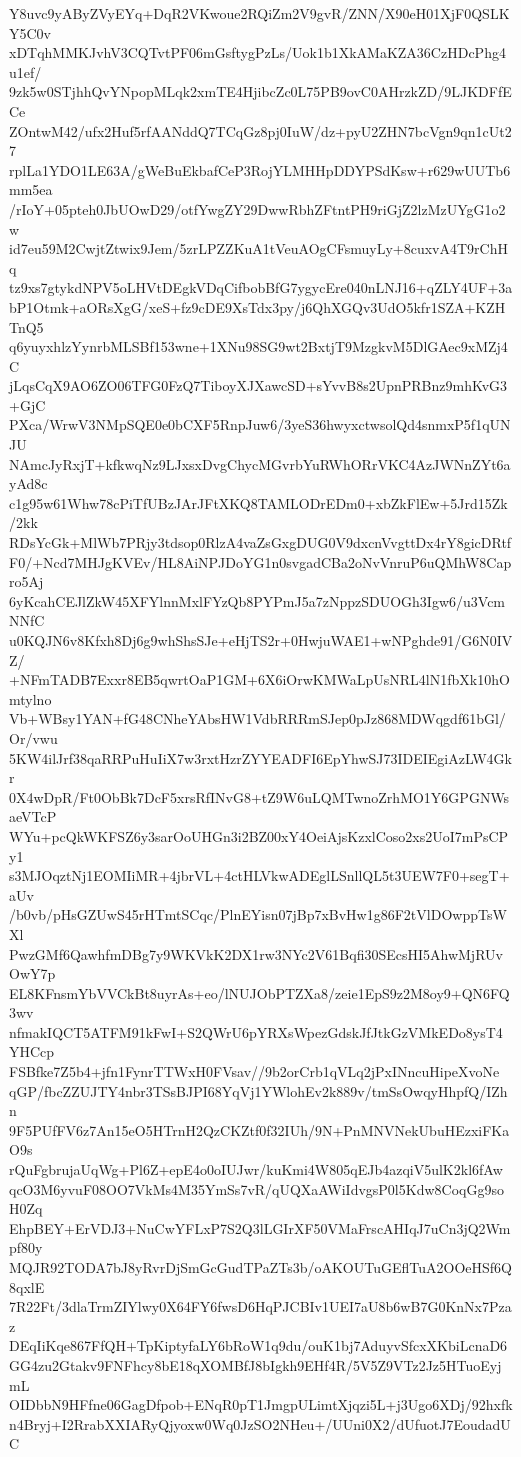 Y8uvc9yAByZVyEYq+DqR2VKwoue2RQiZm2V9gvR/ZNN/X90eH01XjF0QSLKY5C0v
xDTqhMMKJvhV3CQTvtPF06mGsftygPzLs/Uok1b1XkAMaKZA36CzHDcPhg4u1ef/
9zk5w0STjhhQvYNpopMLqk2xmTE4HjibcZc0L75PB9ovC0AHrzkZD/9LJKDFfECe
ZOntwM42/ufx2Huf5rfAANddQ7TCqGz8pj0IuW/dz+pyU2ZHN7bcVgn9qn1cUt27
rplLa1YDO1LE63A/gWeBuEkbafCeP3RojYLMHHpDDYPSdKsw+r629wUUTb6mm5ea
/rIoY+05pteh0JbUOwD29/otfYwgZY29DwwRbhZFtntPH9riGjZ2lzMzUYgG1o2w
id7eu59M2CwjtZtwix9Jem/5zrLPZZKuA1tVeuAOgCFsmuyLy+8cuxvA4T9rChHq
tz9xs7gtykdNPV5oLHVtDEgkVDqCifbobBfG7ygycEre040nLNJ16+qZLY4UF+3a
bP1Otmk+aORsXgG/xeS+fz9cDE9XsTdx3py/j6QhXGQv3UdO5kfr1SZA+KZHTnQ5
q6yuyxhlzYynrbMLSBf153wne+1XNu98SG9wt2BxtjT9MzgkvM5DlGAec9xMZj4C
jLqsCqX9AO6ZO06TFG0FzQ7TiboyXJXawcSD+sYvvB8s2UpnPRBnz9mhKvG3+GjC
PXca/WrwV3NMpSQE0e0bCXF5RnpJuw6/3yeS36hwyxctwsolQd4snmxP5f1qUNJU
NAmcJyRxjT+kfkwqNz9LJxsxDvgChycMGvrbYuRWhORrVKC4AzJWNnZYt6ayAd8c
c1g95w61Whw78cPiTfUBzJArJFtXKQ8TAMLODrEDm0+xbZkFlEw+5Jrd15Zk/2kk
RDsYcGk+MlWb7PRjy3tdsop0RlzA4vaZsGxgDUG0V9dxcnVvgttDx4rY8gicDRtf
F0/+Ncd7MHJgKVEv/HL8AiNPJDoYG1n0svgadCBa2oNvVnruP6uQMhW8Capro5Aj
6yKcahCEJlZkW45XFYlnnMxlFYzQb8PYPmJ5a7zNppzSDUOGh3Igw6/u3VcmNNfC
u0KQJN6v8Kfxh8Dj6g9whShsSJe+eHjTS2r+0HwjuWAE1+wNPghde91/G6N0IVZ/
+NFmTADB7Exxr8EB5qwrtOaP1GM+6X6iOrwKMWaLpUsNRL4lN1fbXk10hOmtylno
Vb+WBsy1YAN+fG48CNheYAbsHW1VdbRRRmSJep0pJz868MDWqgdf61bGl/Or/vwu
5KW4ilJrf38qaRRPuHuIiX7w3rxtHzrZYYEADFI6EpYhwSJ73IDEIEgiAzLW4Gkr
0X4wDpR/Ft0ObBk7DcF5xrsRfINvG8+tZ9W6uLQMTwnoZrhMO1Y6GPGNWsaeVTcP
WYu+pcQkWKFSZ6y3sarOoUHGn3i2BZ00xY4OeiAjsKzxlCoso2xs2UoI7mPsCPy1
s3MJOqztNj1EOMIiMR+4jbrVL+4ctHLVkwADEglLSnllQL5t3UEW7F0+segT+aUv
/b0vb/pHsGZUwS45rHTmtSCqc/PlnEYisn07jBp7xBvHw1g86F2tVlDOwppTsWXl
PwzGMf6QawhfmDBg7y9WKVkK2DX1rw3NYc2V61Bqfi30SEcsHI5AhwMjRUvOwY7p
EL8KFnsmYbVVCkBt8uyrAs+eo/lNUJObPTZXa8/zeie1EpS9z2M8oy9+QN6FQ3wv
nfmakIQCT5ATFM91kFwI+S2QWrU6pYRXsWpezGdskJfJtkGzVMkEDo8ysT4YHCcp
FSBfke7Z5b4+jfn1FynrTTWxH0FVsav//9b2orCrb1qVLq2jPxINncuHipeXvoNe
qGP/fbcZZUJTY4nbr3TSsBJPI68YqVj1YWlohEv2k889v/tmSsOwqyHhpfQ/IZhn
9F5PUfFV6z7An15eO5HTrnH2QzCKZtf0f32IUh/9N+PnMNVNekUbuHEzxiFKaO9s
rQuFgbrujaUqWg+Pl6Z+epE4o0oIUJwr/kuKmi4W805qEJb4azqiV5ulK2kl6fAw
qcO3M6yvuF08OO7VkMs4M35YmSs7vR/qUQXaAWiIdvgsP0l5Kdw8CoqGg9soH0Zq
EhpBEY+ErVDJ3+NuCwYFLxP7S2Q3lLGIrXF50VMaFrscAHIqJ7uCn3jQ2Wmpf80y
MQJR92TODA7bJ8yRvrDjSmGcGudTPaZTs3b/oAKOUTuGEflTuA2OOeHSf6Q8qxlE
7R22Ft/3dlaTrmZIYlwy0X64FY6fwsD6HqPJCBIv1UEI7aU8b6wB7G0KnNx7Pzaz
DEqIiKqe867FfQH+TpKiptyfaLY6bRoW1q9du/ouK1bj7AduyvSfcxXKbiLcnaD6
GG4zu2Gtakv9FNFhcy8bE18qXOMBfJ8bIgkh9EHf4R/5V5Z9VTz2Jz5HTuoEyjmL
OIDbbN9HFfne06GagDfpob+ENqR0pT1JmgpULimtXjqzi5L+j3Ugo6XDj/92hxfk
n4Bryj+I2RrabXXIARyQjyoxw0Wq0JzSO2NHeu+/UUni0X2/dUfuotJ7EoudadUC
